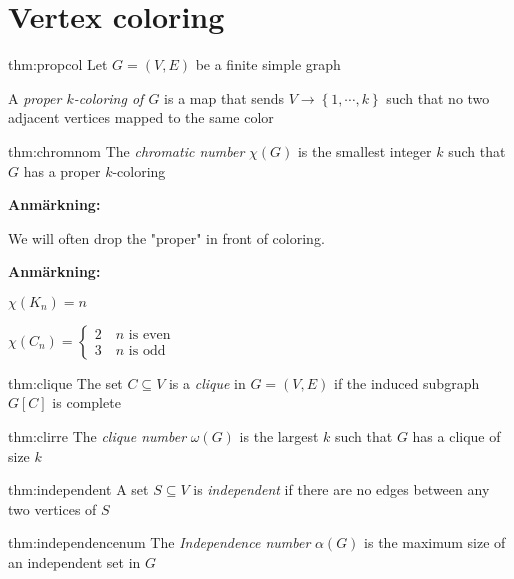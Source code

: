 \section{Vertex coloring}\par
\begin{theo}{thm:propcol}
  Let $G = (V,E)$ be a finite simple graph
  \par\bigskip
\noindent A \textit{proper $k$-coloring of $G$} is a map that sends $V\to\left\{1,\cdots,k\right\}$ such that no two adjacent vertices mapped to the same color
\end{theo}
\par\bigskip
\begin{theo}{thm:chromnom}
  The \textit{chromatic number} $\chi(G)$ is the smallest integer $k$ such that $G$ has a proper $k$-coloring
\end{theo}
\par\bigskip
\noindent\textbf{Anmärkning:}\par
\noindent We will often drop the "proper" in front of coloring.
\par\bigskip
\noindent\textbf{Anmärkning:}\par
\noindent $\chi(K_n) = n$\par
\noindent $\chi(C_n) = \begin{cases}2\quad\text{$n$ is even}\\3\quad\text{$n$ is odd}\end{cases}$
\par\bigskip
\begin{theo}[Clique]{thm:clique}
  The set $C\subseteq V$ is a \textit{clique}  in $G = (V,E)$ if the induced subgraph $G[C]$ is complete
\end{theo}
\par\bigskip
\begin{theo}{thm:clirre}
  The \textit{clique number} $\omega(G)$ is the largest $k$ such that $G$ has a clique of size $k$
\end{theo}
\par\bigskip
\begin{theo}[Independent]{thm:independent}
  A set $S\subseteq V$ is \textit{independent} if there are no edges between any two vertices of $S$
\end{theo}
\par\bigskip
\begin{theo}{thm:independencenum}
  The \textit{Independence number} $\alpha(G)$ is the maximum size of an independent set in $G$
\end{theo}
